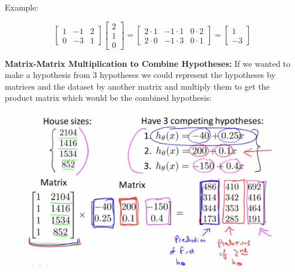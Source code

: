 \documentclass{article}
\begin{document}
        \noindent Example:

        \begin{equation*}
            \begin{bmatrix}
                1 & -1 & 2 \\
                0 & -3 & 1
            \end{bmatrix}
            \begin{bmatrix}
                2 \\
                1 \\
                0
            \end{bmatrix}
            =
            \begin{bmatrix}
                2\cdot 1    & -1\cdot 1 & 0\cdot 2 \\
                2\cdot 0    & -1\cdot 3 & 0\cdot 1
            \end{bmatrix}
            =
            \begin{bmatrix}
                1 \\
                -3
            \end{bmatrix}
        \end{equation*}

        \noindent \textbf{Matrix-Matrix Multiplication to Combine Hypotheses:} If we wanted to make a
        hypothesis from 3 hypotheses we could represent the hypotheses by matrices and the dataset by another
        matrix and multiply them to get the product matrix which would be the combined hypothesis:

        \begin{figure}[hbt!]
            \centering
            \includegraphics[scale=0.4]{Resources/Hypothesis_Combination}
        \end{figure}
\end{document}
